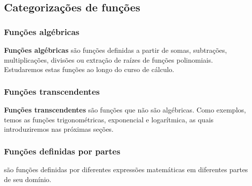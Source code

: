 \subsection{Categorizações de funções}

\subsubsection{Funções algébricas}

{\bf Funções algébricas} são funções definidas a partir de somas, subtrações, multiplicações, divisões ou extração de raízes de funções polinomiais. Estudaremos estas funções ao longo do curso de cálculo.

\subsubsection{Funções transcendentes}

{\bf Funções transcendentes}{} são funções que não são algébricas. Como exemplos, temos as funções trigonométricas, exponencial e logarítmica, as quais introduziremos nas próximas seções.

\subsubsection{Funções definidas por partes}

 são funções definidas por diferentes expressões matemáticas em diferentes partes de seu domínio.



